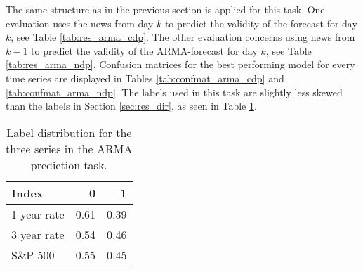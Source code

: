 The same structure as in the previous section is applied for this task. One evaluation uses the news from day $k$ to predict the validity of the forecast for day $k$, see Table \ref{tab:res_arma_cdp}. The other evaluation concerns using news from $k-1$ to predict the validity of the ARMA-forecast for day $k$, see Table \ref{tab:res_arma_ndp}. Confusion matrices for the best performing model for every time series are displayed in Tables \ref{tab:confmat_arma_cdp} and \ref{tab:confmat_arma_ndp}.
The labels used in this task are slightly less skewed than the labels in Section \ref{sec:res_dir}, as seen in Table \ref{tab:label_dist2}.

\begin{table}[!htb]
    \centering
    \begin{tabular}{lrr}
       \textbf{Index}  & \textbf{0} & \textbf{1} \\
        \hline \hline 
        1 year rate & 0.61 & 0.39 \\
        3 year rate & 0.54 & 0.46 \\
        S\&P 500 & 0.55 & 0.45  \\
        \hline 
    \end{tabular}
    \caption{Label distribution for the three series in the ARMA prediction task. }
    \label{tab:label_dist2}
\end{table}


